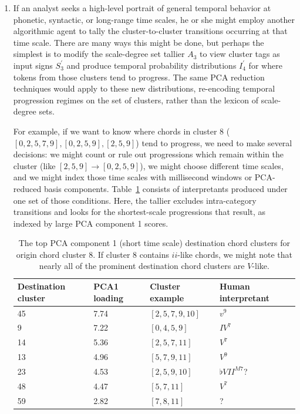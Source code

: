 \begin{enumerate}
	\item If an analyst seeks a high-level portrait of general temporal behavior at phonetic, syntactic, or long-range time scales, he or she might employ another algorithmic agent to tally the cluster-to-cluster transitions occurring at that time scale.  There are many ways this might be done, but perhaps the simplest is to modify the scale-degree set tallier $A_3$ to view cluster tags as input signs $S_3^{\prime}$ and produce temporal probability distributions $I_4^{\prime}$ for where tokens from those clusters tend to progress.  The same PCA reduction techniques would apply to these new distributions, re-encoding temporal progression regimes on the set of clusters, rather than the lexicon of scale-degree sets.
	
For example, if we want to know where chords in cluster 8 ($[0,2,5,7,9],[0,2,5,9],[2,5,9]$) tend to progress, we need to make several decisions: we might count or rule out progressions which remain within the cluster (like $[2,5,9] \rightarrow [0,2,5,9]$), we might choose different time scales, and we might index those time scales with millisecond windows or PCA-reduced basis components.  Table~\ref{8_progs} consists of interpretants produced under one set of those conditions.  Here, the tallier excludes intra-category transitions and looks for the shortest-scale progressions that result, as indexed by large PCA component 1 scores.
	
	\begin{table}
	\centering
	\caption{The top PCA component 1 (short time scale) destination chord clusters for origin chord cluster 8.  If cluster 8 contains $ii$-like chords, we might note that nearly all of the prominent destination chord clusters are $V$-like.}
	\label{8_progs}
	\begin{tabular}{p{0.75in} | p{0.75in} | >{\raggedright}p{1in} | >{\raggedright\arraybackslash}p{1in} }
	\hline\hline
	Destination cluster & PCA1 loading & Cluster example & Human interpretant\\ \hline
	45 & 7.74 & $[2,5,7,9,10]$ & $v^9$\\ \hline
	9 & 7.22 & $[0,4,5,9]$ & $IV^7$\\ \hline
	14 & 5.36 & $[2,5,7,11]$ & $V^7$\\ \hline
	13 & 4.96 & $[5,7,9,11]$ & $V^9$\\ \hline
	23 & 4.53 & $[2,5,9,10]$ & $\flat VII^{M7}$?\\ \hline
	48 & 4.47 & $[5,7,11]$ & $V^7$\\ \hline
	59 & 2.82 & $[7,8,11]$ & ?\\ \hline
	\end{tabular}
	\end{table}
	

\end{enumerate}

